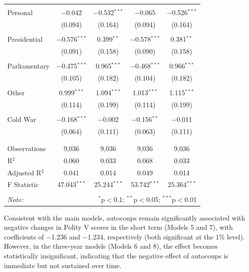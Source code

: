 \documentclass[
  12pt,
]{report}
\begin{document}
\begin{table}
{\begin{tabular}{@{\extracolsep{20pt}}lcccc}
  & & & & \\ 
 \hspace{1.5cm} Personal & $-$0.042 & $-$0.532$^{***}$ & $-$0.065 & $-$0.526$^{***}$ \\ 
  & (0.094) & (0.164) & (0.094) & (0.164) \\ 
  & & & & \\ 
 \hspace{1.5cm} Presidential & $-$0.576$^{***}$ & 0.399$^{**}$ & $-$0.578$^{***}$ & 0.381$^{**}$ \\ 
  & (0.091) & (0.158) & (0.090) & (0.158) \\ 
  & & & & \\ 
 \hspace{1.5cm} Parliamentary & $-$0.475$^{***}$ & 0.965$^{***}$ & $-$0.468$^{***}$ & 0.966$^{***}$ \\ 
  & (0.105) & (0.182) & (0.104) & (0.182) \\ 
  & & & & \\ 
 \hspace{1.5cm} Other & 0.999$^{***}$ & 1.094$^{***}$ & 1.013$^{***}$ & 1.115$^{***}$ \\ 
  & (0.114) & (0.199) & (0.114) & (0.199) \\ 
  & & & & \\ 
 Cold War & $-$0.168$^{***}$ & $-$0.002 & $-$0.156$^{**}$ & $-$0.011 \\ 
  & (0.064) & (0.111) & (0.063) & (0.111) \\ 
  & & & & \\ 
\hline \\[-1.8ex] 
Observations & 9,036 & 9,036 & 9,036 & 9,036 \\ 
R$^{2}$ & 0.060 & 0.033 & 0.068 & 0.033 \\ 
Adjusted R$^{2}$ & 0.041 & 0.014 & 0.049 & 0.014 \\ 
F Statistic & 47.043$^{***}$ & 25.244$^{***}$ & 53.742$^{***}$ & 25.364$^{***}$ \\ 
\hline 
\hline \\[-1.8ex] 
\textit{Note:}  & \multicolumn{4}{r}{$^{*}$p$<$0.1; $^{**}$p$<$0.05; $^{***}$p$<$0.01} \\ 
\end{tabular}

}

\end{table}%

Consistent with the main models, autocoups remain significantly
associated with negative changes in Polity V scores in the short term
(Models 5 and 7), with coefficients of −1.236 and −1.234, respectively
(both significant at the \(1\%\) level). However, in the three-year
models (Models 6 and 8), the effect becomes statistically insignificant,
indicating that the negative effect of autocoups is immediate but not
sustained over time.
\end{document}
